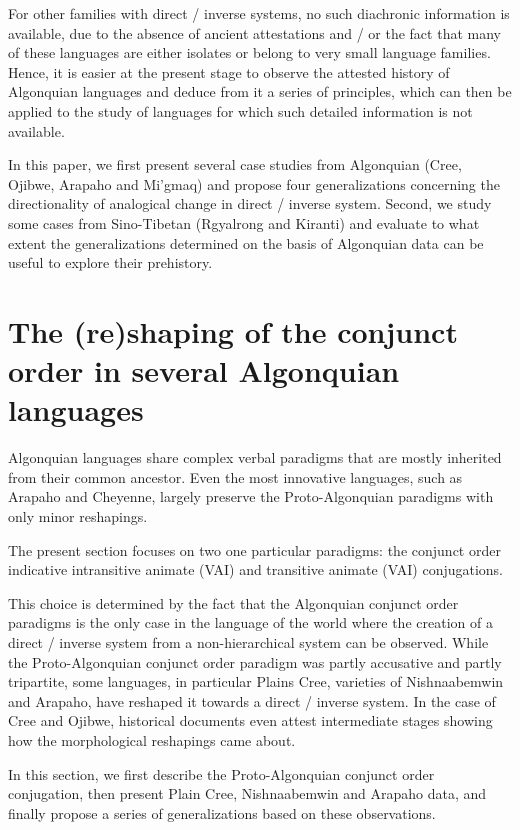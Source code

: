 \documentclass[twoside,a4paper,11pt]{article}
\newcommand{\Σ}{\greek{Σ}}
\begin{document}
For other families with direct / inverse systems, no such diachronic information is available, due to the absence of ancient attestations and / or the fact that many of these languages are either isolates or belong to very small language families. Hence, it is easier at the present stage to observe the attested history of Algonquian languages and deduce from it a series of principles, which can then be applied to the study of languages for which such detailed information is not available.

In this paper, we first present   several case studies from Algonquian (Cree, Ojibwe, Arapaho and Mi'gmaq) and propose four generalizations concerning the directionality of analogical change in direct / inverse system. Second, we study some cases from Sino-Tibetan (Rgyalrong and Kiranti) and evaluate to what extent the generalizations determined on the basis of Algonquian data can be useful to explore their prehistory.



\section{The (re)shaping of the conjunct order in several Algonquian languages }

Algonquian languages share complex verbal paradigms that are mostly inherited from their common ancestor. Even the most innovative languages, such as Arapaho and Cheyenne, largely preserve the Proto-Algonquian paradigms with only minor reshapings.

The present section focuses on two one particular paradigms: the conjunct order indicative intransitive animate (VAI) and transitive animate (VAI) conjugations. 

This choice is determined by the fact that the Algonquian conjunct order paradigms is the only case in the language of the world where the creation of a direct / inverse system from a non-hierarchical   system can be observed. While the Proto-Algonquian conjunct order paradigm was partly accusative and partly tripartite, some languages, in particular Plains Cree, varieties of Nishnaabemwin and Arapaho, have reshaped it towards a direct / inverse system. In the case of Cree and Ojibwe, historical documents even attest intermediate stages showing how the morphological reshapings came about.

In this section, we first describe the Proto-Algonquian conjunct order conjugation, then present Plain Cree, Nishnaabemwin and Arapaho data, and finally propose a series of generalizations based on these observations.
\end{document}
